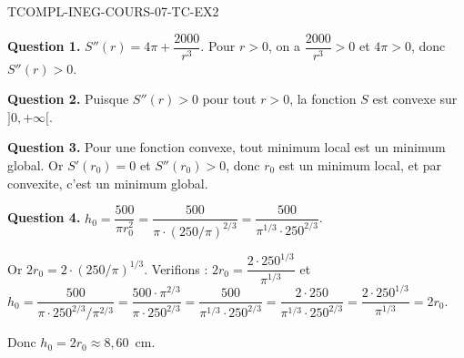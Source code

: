 \begin{corrige}{TCOMPL-INEG-COURS-07-TC-EX2}

\textbf{Question 1.} $S''(r) = 4\pi + \dfrac{2000}{r^3}$. Pour $r > 0$, on a $\dfrac{2000}{r^3} > 0$ et $4\pi > 0$, donc $S''(r) > 0$.

\textbf{Question 2.} Puisque $S''(r) > 0$ pour tout $r > 0$, la fonction $S$ est convexe sur $]0, +\infty[$.

\textbf{Question 3.} Pour une fonction convexe, tout minimum local est un minimum global. Or $S'(r_0) = 0$ et $S''(r_0) > 0$, donc $r_0$ est un minimum local, et par convexite, c'est un minimum global.

\textbf{Question 4.} $h_0 = \dfrac{500}{\pi r_0^2} = \dfrac{500}{\pi \cdot (250/\pi)^{2/3}} = \dfrac{500}{\pi^{1/3} \cdot 250^{2/3}}$.

Or $2r_0 = 2 \cdot (250/\pi)^{1/3}$. Verifions : $2r_0 = \dfrac{2 \cdot 250^{1/3}}{\pi^{1/3}}$ et $h_0 = \dfrac{500}{\pi \cdot 250^{2/3}/\pi^{2/3}} = \dfrac{500 \cdot \pi^{2/3}}{\pi \cdot 250^{2/3}} = \dfrac{500}{\pi^{1/3} \cdot 250^{2/3}} = \dfrac{2 \cdot 250}{\pi^{1/3} \cdot 250^{2/3}} = \dfrac{2 \cdot 250^{1/3}}{\pi^{1/3}} = 2r_0$.

Donc $h_0 = 2r_0 \approx 8{,}60$~cm.

\end{corrige}
